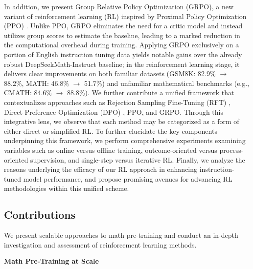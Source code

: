 In addition, we present Group Relative Policy Optimization (GRPO), a new variant of reinforcement learning (RL) inspired by Proximal Policy Optimization (PPO) \citep{schulman2017proximal}. Unlike PPO, GRPO eliminates the need for a critic model and instead utilizes group scores to estimate the baseline, leading to a marked reduction in the computational overhead during training. Applying GRPO exclusively on a portion of English instruction tuning data yields notable gains over the already robust DeepSeekMath-Instruct baseline; in the reinforcement learning stage, it delivers clear improvements on both familiar datasets (GSM8K: 82.9\% $\rightarrow$ 88.2\%, MATH: 46.8\% $\rightarrow$ 51.7\%) and unfamiliar mathematical benchmarks (e.g., CMATH: 84.6\% $\rightarrow$ 88.8\%). We further contribute a unified framework that contextualizes approaches such as Rejection Sampling Fine-Tuning (RFT) \citep{yuan2023scaling}, Direct Preference Optimization (DPO) \citep{dpo}, PPO, and GRPO. Through this integrative lens, we observe that each method may be categorized as a form of either direct or simplified RL. To further elucidate the key components underpinning this framework, we perform comprehensive experiments examining variables such as online versus offline training, outcome-oriented versus process-oriented supervision, and single-step versus iterative RL. Finally, we analyze the reasons underlying the efficacy of our RL approach in enhancing instruction-tuned model performance, and propose promising avenues for advancing RL methodologies within this unified scheme.

\subsection{Contributions}
We present scalable approaches to math pre-training and conduct an in-depth investigation and assessment of reinforcement learning methods.

\textbf{Math Pre-Training at Scale}

